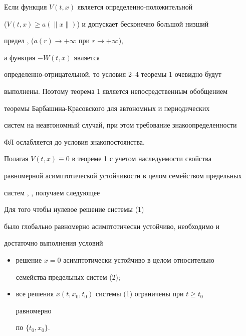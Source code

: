  




\begin{note} Если функция $V(t,x)$ является определенно-положительной 


($V(t,x)\ge a(\|x\|)$) и допускает бесконечно большой низший 


предел \cite{Bar}, \cite{Kra} ($a(r)\to+\infty$ при $r\to+\infty$), 


а функция $-W(t,x)$ является 


определенно-отрицательной, то условия 2--4 теоремы 1 очевидно будут 


выполнены. Поэтому теорема 1 является непосредственным обобщением 


теоремы Барбашина-Красовского для автономных \cite{Bar} и периодических 


\cite{Kra} 


систем на неавтономный случай, при этом требование знакоопределенности 


ФЛ ослабляется до условия знакопостоянства. 


\end{note} 


 


Полагая $V(t,x)\equiv 0$ в теореме 1 с учетом наследуемости свойства 


равномерной асимптотической устойчивости в целом семейством предельных 


систем \cite{Art2}, \cite{She}, получаем следующее 


 




\begin{cornonum} Для того чтобы нулевое решение системы (1) 


было глобально равномерно асимптотически устойчиво, необходимо и 


достаточно выполнения условий


\begin{itemize} 


\item[1.] решение $x=0$ асимптотически устойчиво в целом относительно 


семейства предельных систем (2); 


\item[2.] все решения $x(t,x_0,t_0)$ системы (1) ограничены при $t\ge t_0$ 


равномерно 


по $\{t_0,x_0\}$. 


\end{itemize} 


\end{cornonum} 



